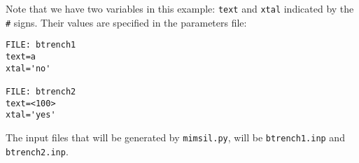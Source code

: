 Note that we have two variables in this example: \texttt{text} and
\texttt{xtal} indicated by the \texttt{\#} signs. Their values are specified in
the parameters file:

\begin{verbatim}
FILE: btrench1
text=a
xtal='no'

FILE: btrench2
text=<100>
xtal='yes'
\end{verbatim}

The input files that will be generated by \texttt{mimsil.py}, will be
\texttt{btrench1.inp} and \texttt{btrench2.inp}.
